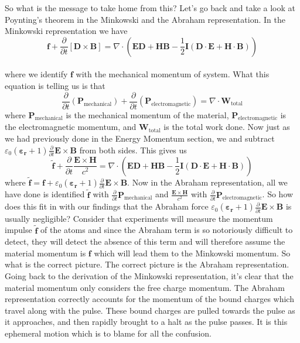 So what is the message to take home from this?  Let's go back and take a look at Poynting's theorem in the Minkowski and the Abraham representation.  In the Minkowski representation we have
\begin{equation}
\mathbf{f}+\frac{\partial}{\partial t}\left[\mathbf{D}\times\mathbf{B}\right]=\nabla\cdot\left(\mathbf{E}\mathbf{D}+\mathbf{H}\mathbf{B}-\frac{1}{2}\mathbf{I}\left(\mathbf{D}\cdot\mathbf{E}+\mathbf{H}\cdot\mathbf{B}\right)\right)
\end{equation}
\\
where we identify $\mathbf{f}$ with the mechanical momentum of system.  What this equation is telling us is that 
\begin{equation}
\frac{\partial}{\partial t}\left(\mathbf{P}_{\mathrm{mechanical}}\right)+\frac{\partial}{\partial t}\left(\mathbf{P}_{\mathrm{electromagnetic}}\right)=\nabla\cdot\mathbf{W}_{\mathrm{total}}
\end{equation}
where $\mathbf{P}_{\mathrm{mechanical}}$ is the mechanical momentum of the material, $\mathbf{P}_{\mathrm{electromagnetic}}$ is the electromagnetic momentum, and $\mathbf{W}_{\mathrm{total}}$ is the total work done.  Now just as we had previously done in the Energy Momentum section, we and subtract  
$\varepsilon_0\left(\mathbf{\varepsilon_r}+1\right)\frac{\partial}{\partial t}\mathbf{E}\times\mathbf{B}$ from both sides.  This gives us
\begin{equation}
\tilde{\mathbf{f}}+\frac{\partial}{\partial t}\frac{\mathbf{E}\times\mathbf{H}}{c^2} =\nabla\cdot\left(\mathbf{E}\mathbf{D}+\mathbf{H}\mathbf{B}-\frac{1}{2}\mathbf{I}\left(\mathbf{D}\cdot\mathbf{E}+\mathbf{H}\cdot\mathbf{B}\right)\right)
\end{equation}
where $\tilde{\mathbf{f}}=\mathbf{f}+\varepsilon_0\left(\mathbf{\varepsilon_r}+1\right)\frac{\partial}{\partial t}\mathbf{E}\times\mathbf{B}$.  Now in the Abraham representation, all we have done is identified $\tilde{\mathbf{f}}$ with $\frac{\partial}{\partial t}\mathbf{P}_{\mathrm{mechanical}}$ and $\frac{\mathbf{E}\times\mathbf{H}}{c^2}$ with $\frac{\partial}{\partial t}\mathbf{P}_{\mathrm{electromagnetic}}$.  So how does this fit in with our findings that the Abraham force $\varepsilon_0\left(\mathbf{\varepsilon_r}+1\right)\frac{\partial}{\partial t}\mathbf{E}\times\mathbf{B}$ is usually negligible?  Consider that experiments will measure the momentum impulse $\tilde{\mathbf{f}}$ of the atoms and since the Abraham term is so notoriously difficult to detect, they will detect the absence of this term and will therefore assume the material momentum is $\mathbf{f}$ which will lead them to the Minkowski momentum.  So what is the correct picture.  The correct picture is the Abraham representation.  Going back to the derivation of the Minkowski representation, it's clear that the material momentum only considers the free charge momentum.  The Abraham representation correctly accounts for the momentum of the bound charges which travel along with the pulse.  These bound charges are pulled towards the pulse as it approaches, and then rapidly brought to a halt as the pulse passes.  It is this ephemeral motion which is to blame for all the confusion.  




